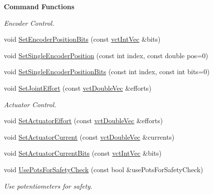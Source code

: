 \begin{Indent}{\bf Command Functions}
\begin{DoxyCompactItemize}
\begin{DoxyCompactList}\small\item\em Encoder Control. \end{DoxyCompactList}\item 
void \hyperlink{classsaw_robot_i_o1394_1_1osa_robot1394_a64b8bc6716c9e9d1be66f55618cdb6d6}{Set\-Encoder\-Position\-Bits} (const \hyperlink{vct_dynamic_vector_types_8h_a47260df0b570a25352b3f318ed0b4c4e}{vct\-Int\-Vec} \&bits)
\item 
void \hyperlink{classsaw_robot_i_o1394_1_1osa_robot1394_aed34a0863a908df33e54a828b93a8230}{Set\-Single\-Encoder\-Position} (const int index, const double pos=0)
\item 
void \hyperlink{classsaw_robot_i_o1394_1_1osa_robot1394_ab7dee648d9d063e7cc24cdc904859538}{Set\-Single\-Encoder\-Position\-Bits} (const int index, const int bits=0)
\item 
void \hyperlink{classsaw_robot_i_o1394_1_1osa_robot1394_a4a7625a56a46deac9ccb4a941cf8cda6}{Set\-Joint\-Effort} (const \hyperlink{vct_dynamic_vector_types_8h_ade4b3068c86fb88f41af2e5187e491c2}{vct\-Double\-Vec} \&efforts)
\begin{DoxyCompactList}\small\item\em Actuator Control. \end{DoxyCompactList}\item 
void \hyperlink{classsaw_robot_i_o1394_1_1osa_robot1394_a4e2c3a7ff10a61f01b31017e2542422b}{Set\-Actuator\-Effort} (const \hyperlink{vct_dynamic_vector_types_8h_ade4b3068c86fb88f41af2e5187e491c2}{vct\-Double\-Vec} \&efforts)
\item 
void \hyperlink{classsaw_robot_i_o1394_1_1osa_robot1394_a071968e765c8811d219247a9cb9cc301}{Set\-Actuator\-Current} (const \hyperlink{vct_dynamic_vector_types_8h_ade4b3068c86fb88f41af2e5187e491c2}{vct\-Double\-Vec} \&currents)
\item 
void \hyperlink{classsaw_robot_i_o1394_1_1osa_robot1394_a12573b0a6f08989503310c143ff38b11}{Set\-Actuator\-Current\-Bits} (const \hyperlink{vct_dynamic_vector_types_8h_a47260df0b570a25352b3f318ed0b4c4e}{vct\-Int\-Vec} \&bits)
\item 
void \hyperlink{classsaw_robot_i_o1394_1_1osa_robot1394_ac47f7c391fc2893c8102be62c58f1688}{Use\-Pots\-For\-Safety\-Check} (const bool \&use\-Pots\-For\-Safety\-Check)
\begin{DoxyCompactList}\small\item\em Use potentiometers for safety. \end{DoxyCompactList}\item 

\end{DoxyCompactItemize}
\end{Indent}
